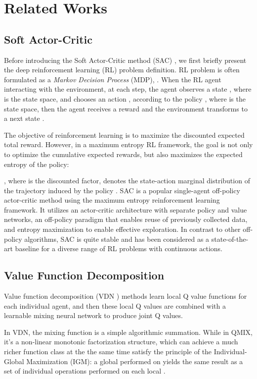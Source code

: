 \documentclass[runningheads]{llncs}
\begin{document}
\section{Related Works}\label{related work}
\subsection{Soft Actor-Critic}
Before introducing the Soft Actor-Critic method (SAC) \cite{b11}, we first briefly present the deep reinforcement learning (RL) problem definition. RL problem is often formulated as a {\em Markov Decision Process} (MDP), . When the RL agent interacting with the environment, at each step, the agent observes a state , where  is the state space, and chooses an action , according to the policy , where  is the state space, then the agent receives a reward  and the environment transforms to a next state . 


The objective of reinforcement learning is to maximize the discounted expected total reward. However, in a maximum entropy RL framework, the goal is not only  to optimize the cumulative expected rewards, but also maximizes the expected entropy of the policy:

, where  is the discounted factor,  denotes 
the state-action marginal distribution of the trajectory
induced by the policy .
SAC is a popular single-agent off-policy actor-critic method
using the maximum entropy reinforcement learning framework. It utilizes an actor-critic architecture with separate policy and value networks, an off-policy paradigm that enables reuse of previously collected data, and entropy maximization to enable effective exploration. In contrast to other off-policy algorithms, SAC is quite stable and has been considered as a state-of-the-art baseline for a diverse range of RL problems with continuous actions.


\subsection{Value Function Decomposition}
Value function decomposition (VDN ) \cite{b9} methods learn local Q value functions for each individual agent, and then these local Q values are combined with a learnable mixing neural network to produce
joint Q values. 

In VDN, the mixing function  is a simple algorithmic summation. While in QMIX, it's a non-linear monotonic factorization structure, which can achieve a much richer function class at the the same time satisfy the principle of the Individual-Global Maximization (IGM):  a global  performed on  yields the same result as a set of individual  operations
performed on each local .
\end{document}
